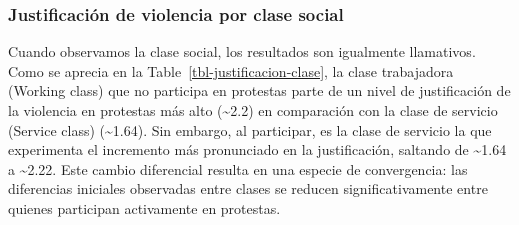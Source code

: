 \documentclass[
  13pt,
]{article}
\begin{document}
\subsubsection{Justificación de violencia por clase
social}\label{justificaciuxf3n-de-violencia-por-clase-social}

Cuando observamos la clase social, los resultados son igualmente
llamativos. Como se aprecia en la Table~\ref{tbl-justificacion-clase},
la clase trabajadora (Working class) que no participa en protestas parte
de un nivel de justificación de la violencia en protestas más alto
(\textasciitilde2.2) en comparación con la clase de servicio (Service
class) (\textasciitilde1.64). Sin embargo, al participar, es la clase de
servicio la que experimenta el incremento más pronunciado en la
justificación, saltando de \textasciitilde1.64 a \textasciitilde2.22.
Este cambio diferencial resulta en una especie de convergencia: las
diferencias iniciales observadas entre clases se reducen
significativamente entre quienes participan activamente en protestas.
\end{document}

